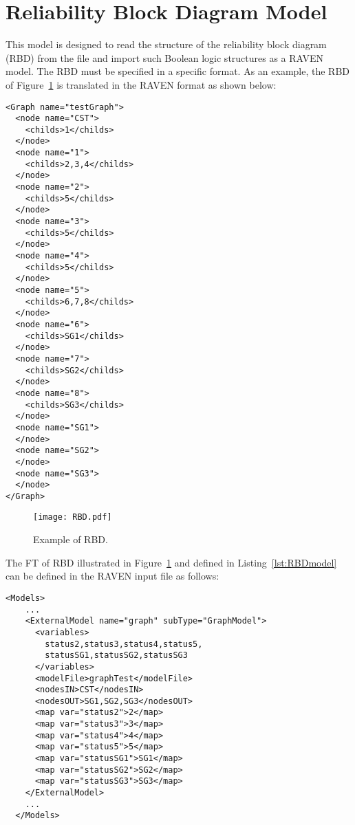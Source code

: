 \section{Reliability Block Diagram Model}
\label{sec:RBDmodel}

This model is designed to read the structure of the reliability block diagram (RBD) from
the file and import such Boolean logic structures as a RAVEN model.
The RBD must be specified in a specific format.
As an example, the RBD of Figure~\ref{fig:RBD} is translated in the RAVEN format as shown below:

\begin{lstlisting}[style=XML,morekeywords={anAttribute},caption=RBD input file., label=lst:RBDmodel]
<Graph name="testGraph">
  <node name="CST">
    <childs>1</childs>
  </node>
  <node name="1">
    <childs>2,3,4</childs>
  </node>
  <node name="2">
    <childs>5</childs>
  </node>
  <node name="3">
    <childs>5</childs>
  </node>
  <node name="4">
    <childs>5</childs>
  </node>
  <node name="5">
    <childs>6,7,8</childs>
  </node>
  <node name="6">
    <childs>SG1</childs>
  </node>
  <node name="7">
    <childs>SG2</childs>
  </node>
  <node name="8">
    <childs>SG3</childs>
  </node>
  <node name="SG1">
  </node>
  <node name="SG2">
  </node>
  <node name="SG3">
  </node>
</Graph>
\end{lstlisting}

\begin{figure}
    \centering
    \centerline{\texttt{[image: RBD.pdf]}}
    \caption{Example of RBD.}
    \label{fig:RBD}
\end{figure}

The FT of RBD illustrated in Figure~\ref{fig:RBD} and defined in Listing~\ref{lst:RBDmodel}
can be defined in the RAVEN input file as follows:

\begin{lstlisting}[style=XML,morekeywords={anAttribute},caption=RBD model input example., label=lst:RBD_InputExample]
  <Models>
    ...
    <ExternalModel name="graph" subType="GraphModel">
      <variables>
        status2,status3,status4,status5,
        statusSG1,statusSG2,statusSG3
      </variables>
      <modelFile>graphTest</modelFile>
      <nodesIN>CST</nodesIN>
      <nodesOUT>SG1,SG2,SG3</nodesOUT>
      <map var="status2">2</map>
      <map var="status3">3</map>
      <map var="status4">4</map>
      <map var="status5">5</map>
      <map var="statusSG1">SG1</map>
      <map var="statusSG2">SG2</map>
      <map var="statusSG3">SG3</map>
    </ExternalModel>
    ...
  </Models>
\end{lstlisting}

